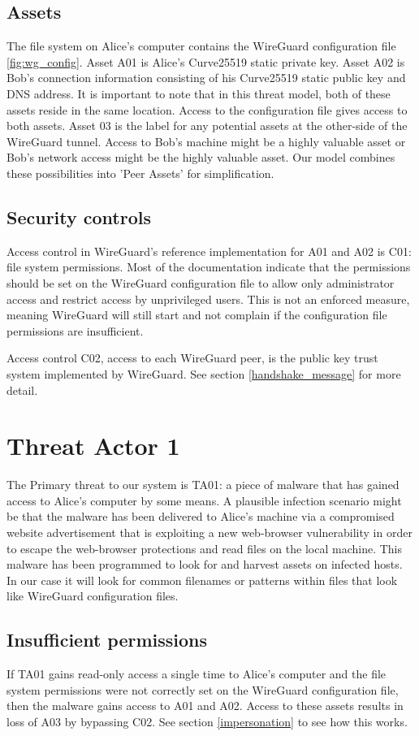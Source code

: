 \documentclass [11pt, proquest] {uwthesis}[2020/02/24]
\begin{document}
\subsection{Assets}
The file system on Alice's computer contains the WireGuard configuration file \ref{fig:wg_config}. 
Asset A01 is Alice's Curve25519 static private key. Asset A02 is Bob's connection information consisting of his Curve25519 static public key and DNS address. It is important to note that in this threat model, both of these assets reside in the same location. Access to the configuration file gives access to both assets.
Asset 03 is the label for any potential assets at the other-side of the WireGuard tunnel. Access to Bob's machine might be a highly valuable asset or Bob's network access might be the highly valuable asset. Our model combines these possibilities into 'Peer Assets' for simplification.

\subsection{Security controls}
Access control in WireGuard's reference implementation for A01 and A02 is C01: file system permissions. Most of the documentation indicate that the permissions should be set on the WireGuard configuration file to allow only administrator access and restrict access by unprivileged users. This is not an enforced measure, meaning WireGuard will still start and not complain if the configuration file permissions are insufficient. 

Access control C02, access to each WireGuard peer, is the public key trust system implemented by WireGuard. See section \ref{handshake_message} for more detail.

\section{Threat Actor 1}
The Primary threat to our system is TA01: a piece of malware that has gained access to Alice's computer by some means. A plausible infection scenario might be that the malware has been delivered to Alice's machine via a compromised website advertisement that is exploiting a new web-browser vulnerability in order to escape the web-browser protections and read files on the local machine.  This malware has been programmed to look for and harvest assets on infected hosts. In our case it will look for common filenames or patterns within files that look like WireGuard configuration files.  
\subsection{Insufficient permissions}
If TA01 gains read-only access a single time to Alice's computer and the file system permissions were not correctly set on the WireGuard configuration file, then the malware gains access to A01 and A02. Access to these assets results in loss of A03 by bypassing C02. See section \ref{impersonation} to see how this works.
\end{document}

